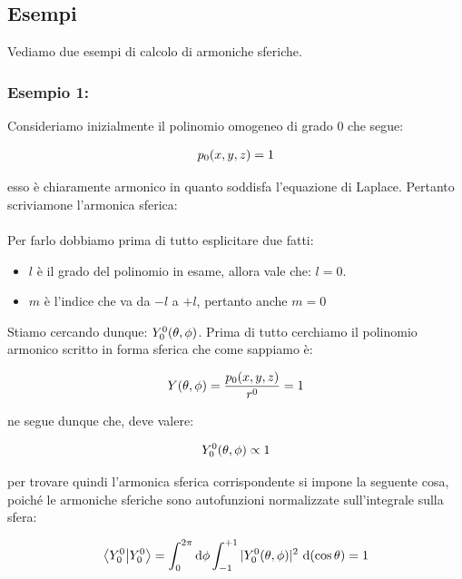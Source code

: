 \subsection{Esempi}

	Vediamo due esempi di calcolo di armoniche sferiche.

\subsubsection{Esempio 1:}

	Consideriamo inizialmente il polinomio omogeneo di grado $0$ che segue:

\begin{align*}
	p_0\qty(x, y, z) = 1
\end{align*}

	esso è chiaramente armonico in quanto soddisfa l'equazione di Laplace. Pertanto scriviamone l'armonica sferica:
	\\
	\\
	Per farlo dobbiamo prima di tutto esplicitare due fatti:
	
\begin{itemize}
	\item $l$ è il grado del polinomio in esame, allora vale che: $l = 0$.
	\item $m$ è l'indice che va da $-l$ a $+l$, pertanto anche $m = 0$
\end{itemize}

	Stiamo cercando dunque: $Y_0^0\qty(\theta, \phi)$. Prima di tutto cerchiamo il polinomio armonico scritto in forma sferica che come sappiamo è:
	
\begin{align*}
	Y\qty(\theta, \phi) = \frac{p_0\qty(x, y, z)}{r^0} = 1
\end{align*}

	ne segue dunque che, deve valere:
	
\begin{align*}
	Y_0^0 \qty(\theta, \phi) \propto 1
\end{align*}

	per trovare quindi l'armonica sferica corrispondente si impone la seguente cosa, poiché le armoniche sferiche sono autofunzioni normalizzate sull’integrale sulla sfera:
	
\begin{align*}
	\braket{Y_0^0} = \int_0^{2\pi} \dd \phi \int_{-1}^{+1} |Y_0^0 (\theta, \phi)|^2 \, \dd (\cos\theta) = 1
\end{align*}

